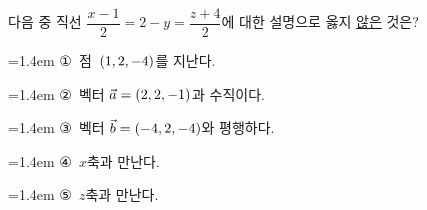 다음 중 직선 $\dfrac{x-1}{2}=2-y=\dfrac{z+4}{2}$에 대한 설명으로 옳지 \underline{않은} 것은?
\par\medskip\par\noindent\hangindent=1.4em {\small ①}\ 점~$(1{,}\mkern3mu\mathopen{}2{,}\mkern3mu\mathopen{}-4)$를 지난다.\par\noindent\hangindent=1.4em {\small ②}\ 벡터 $\vec{a}=(2{,}\mkern3mu\mathopen{}2{,}\mkern3mu\mathopen{}-1)$과 수직이다.\par\noindent\hangindent=1.4em {\small ③}\ 벡터 $\vec{b}=(-4{,}\mkern3mu\mathopen{}2{,}\mkern3mu\mathopen{}-4)$와 평행하다.\par\noindent\hangindent=1.4em {\small ④}\ $x$축과 만난다.\par\noindent\hangindent=1.4em {\small ⑤}\ $z$축과 만난다.\par\medskip
